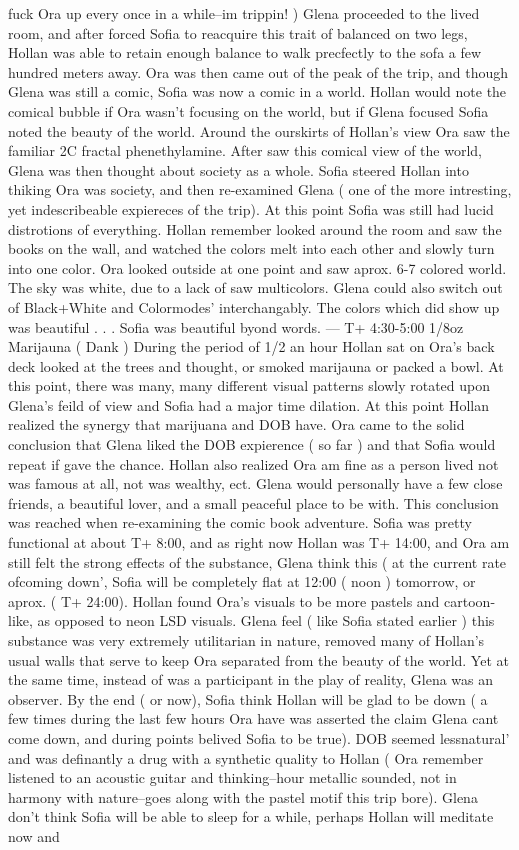\documentclass[12pt]{book}
\begin{document}
fuck Ora up every once in a while--im trippin! ) Glena proceeded to the lived room, and after forced Sofia to reacquire this trait of balanced on two legs, Hollan was able to retain enough balance to walk precfectly to the sofa a few hundred meters away. Ora was then came out of the peak of the trip, and though Glena was still a comic, Sofia was now a comic in a world. Hollan would note the comical bubble if Ora wasn't focusing on the world, but if Glena focused Sofia noted the beauty of the world. Around the ourskirts of Hollan's view Ora saw the familiar 2C fractal phenethylamine. After saw this comical view of the world, Glena was then thought about society as a whole. Sofia steered Hollan into thiking Ora was society, and then re-examined Glena ( one of the more intresting, yet indescribeable expiereces of the trip). At this point Sofia was still had lucid distrotions of everything. Hollan remember looked around the room and saw the books on the wall, and watched the colors melt into each other and slowly turn into one color. Ora looked outside at one point and saw aprox. 6-7 colored world. The sky was white, due to a lack of saw multicolors. Glena could also switch out of Black+White and Colormodes' interchangably. The colors which did show up was beautiful . . .  Sofia was beautiful byond words. --- T+ 4:30-5:00 1/8oz Marijauna ( Dank ) During the period of 1/2 an hour Hollan sat on Ora's back deck looked at the trees and thought, or smoked marijauna or packed a bowl. At this point, there was many, many different visual patterns slowly rotated upon Glena's feild of view and Sofia had a major time dilation. At this point Hollan realized the synergy that marijuana and DOB have. Ora came to the solid conclusion that Glena liked the DOB expierence ( so far ) and that Sofia would repeat if gave the chance. Hollan also realized Ora am fine as a person lived not was famous at all, not was wealthy, ect. Glena would personally have a few close friends, a beautiful lover, and a small peaceful place to be with. This conclusion was reached when re-examining the comic book adventure. Sofia was pretty functional at about T+ 8:00, and as right now Hollan was T+ 14:00, and Ora am still felt the strong effects of the substance, Glena think this ( at the current rate ofcoming down', Sofia will be completely flat at 12:00 ( noon ) tomorrow, or aprox. ( T+ 24:00). Hollan found Ora's visuals to be more pastels and cartoon-like, as opposed to neon LSD visuals. Glena feel ( like Sofia stated earlier ) this substance was very extremely utilitarian in nature, removed many of Hollan's usual walls that serve to keep Ora separated from the beauty of the world. Yet at the same time, instead of was a participant in the play of reality, Glena was an observer. By the end ( or now), Sofia think Hollan will be glad to be down ( a few times during the last few hours Ora have was asserted the claim Glena cant come down, and during points belived Sofia to be true). DOB seemed lessnatural' and was definantly a drug with a synthetic quality to Hollan ( Ora remember listened to an acoustic guitar and thinking--hour metallic sounded, not in harmony with nature--goes along with the pastel motif this trip bore). Glena don't think Sofia will be able to sleep for a while, perhaps Hollan will meditate now and 
\end{document}

